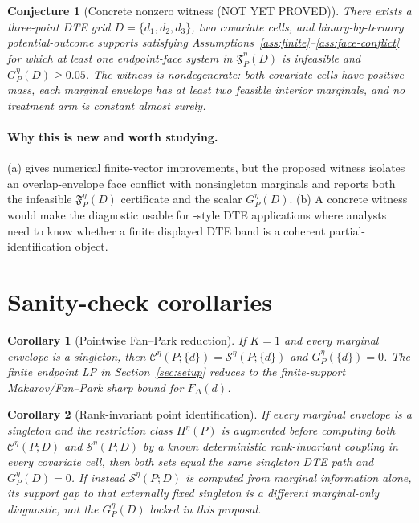 \documentclass[11pt]{article}
\theoremstyle{definition}
\theoremstyle{plain}
\newtheorem{conjecture}{Conjecture}
\newtheorem{corollary}{Corollary}
\theoremstyle{remark}
\begin{document}
\begin{conjecture}[Concrete nonzero witness (NOT YET PROVED)]\label{conj:witness}
There exists a three-point DTE grid \(D=\{d_1,d_2,d_3\}\), two covariate cells,
and binary-by-ternary potential-outcome supports satisfying
Assumptions~\ref{ass:finite}--\ref{ass:face-conflict} for which at least one
endpoint-face system in \(\mathfrak F^\eta_P(D)\) is infeasible and
\(G^\eta_P(D)\ge 0.05\).  The witness is nondegenerate: both covariate cells have
positive mass, each marginal envelope has at least two feasible interior
marginals, and no treatment arm is constant almost surely.
\end{conjecture}
\paragraph{Why this is new and worth studying.}
(a) \citet[Section 2]{FirpoRidder2019} gives numerical finite-vector
improvements, but the proposed witness isolates an overlap-envelope face conflict
with nonsingleton marginals and reports both the infeasible
\(\mathfrak F^\eta_P(D)\) certificate and the scalar \(G^\eta_P(D)\).  (b) A
concrete witness would make the diagnostic usable for
\citet{FrandsenLefgren2021}-style DTE applications where analysts need to know
whether a finite displayed DTE band is a coherent partial-identification object.

\section{Sanity-check corollaries}
\begin{corollary}[Pointwise Fan--Park reduction]\label{cor:pointwise}
If \(K=1\) and every marginal envelope is a singleton, then
\(\mathcal C^\eta(P;\{d\})=\mathcal S^\eta(P;\{d\})\) and
\(G^\eta_P(\{d\})=0\).  The finite endpoint LP in Section~\ref{sec:setup}
reduces to the finite-support Makarov/Fan--Park sharp bound for \(F_\Delta(d)\).
\end{corollary}

\begin{corollary}[Rank-invariant point identification]\label{cor:rank}
If every marginal envelope is a singleton and the restriction class
\(\Pi^\eta(P)\) is augmented before computing both
\(\mathcal C^\eta(P;D)\) and \(\mathcal S^\eta(P;D)\) by a known deterministic
rank-invariant coupling in every covariate cell, then both sets equal the same
singleton DTE path and \(G^\eta_P(D)=0\).  If instead
\(\mathcal S^\eta(P;D)\) is computed from marginal information alone, its support
gap to that externally fixed singleton is a different marginal-only diagnostic,
not the \(G^\eta_P(D)\) locked in this proposal.
\end{corollary}
\end{document}
